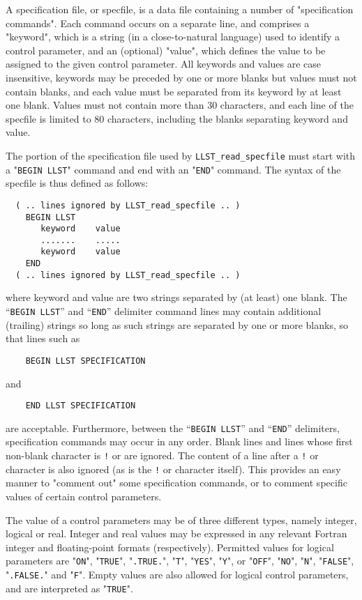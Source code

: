 \documentclass{galahad}
\newcommand{\packagename}{LLST}
\begin{document}
A specification file, or specfile, is a data file containing a number of
"specification commands". Each command occurs on a separate line,
and comprises a "keyword",
which is a string (in a close-to-natural language) used to identify a
control parameter, and
an (optional) "value", which defines the value to be assigned to the given
control parameter. All keywords and values are case insensitive,
keywords may be preceded by one or more blanks but
values must not contain blanks, and
each value must be separated from its keyword by at least one blank.
Values must not contain more than 30 characters, and
each line of the specfile is limited to 80 characters,
including the blanks separating keyword and value.

The portion of the specification file used by
{\tt \packagename\_read\_specfile}
must start
with a "{\tt BEGIN \packagename}" command and end with an
"{\tt END}" command.  The syntax of the specfile is thus defined as follows:
\begin{verbatim}
  ( .. lines ignored by LLST_read_specfile .. )
    BEGIN LLST
       keyword    value
       .......    .....
       keyword    value
    END
  ( .. lines ignored by LLST_read_specfile .. )
\end{verbatim}
where keyword and value are two strings separated by (at least) one blank.
The ``{\tt BEGIN \packagename}'' and ``{\tt END}'' delimiter command lines
may contain additional (trailing) strings so long as such strings are
separated by one or more blanks, so that lines such as
\begin{verbatim}
    BEGIN LLST SPECIFICATION
\end{verbatim}
and
\begin{verbatim}
    END LLST SPECIFICATION
\end{verbatim}
are acceptable. Furthermore,
between the
``{\tt BEGIN \packagename}'' and ``{\tt END}'' delimiters,
specification commands may occur in any order.  Blank lines and
lines whose first non-blank character is {\tt !} or {\tt *} are ignored.
The content
of a line after a {\tt !} or {\tt *} character is also
ignored (as is the {\tt !} or {\tt *}
character itself). This provides an easy manner to "comment out" some
specification commands, or to comment specific values
of certain control parameters.

The value of a control parameters may be of three different types, namely
integer, logical or real.
Integer and real values may be expressed in any relevant Fortran integer and
floating-point formats (respectively). Permitted values for logical
parameters are "{\tt ON}", "{\tt TRUE}", "{\tt .TRUE.}", "{\tt T}",
"{\tt YES}", "{\tt Y}", or "{\tt OFF}", "{\tt NO}",
"{\tt N}", "{\tt FALSE}", "{\tt .FALSE.}" and "{\tt F}".
Empty values are also allowed for
logical control parameters, and are interpreted as "{\tt TRUE}".
\end{document}
